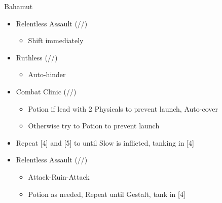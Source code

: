 \documentclass{report}
\begin{document}
\renewcommand{\first}{[1] Relentless Assault (\com/\rav/\rav)}
\renewcommand{\fifth}{[5] Ruthless (\sab/\com/\rav)
\renewcommand{\fourth}{[4] Combat Clinic (\sen/\med/\med)}}
\begin{battle}{Bahamut}
\begin{itemize}
    \item \first
    \begin{itemize}
        \item Shift immediately
    \end{itemize}
    \item \fifth
    \begin{itemize}
        \item Auto-hinder
    \end{itemize}
    \item \fourth
    \begin{itemize}
        \item Potion if lead with 2 Physicals to prevent launch, Auto-cover
        \item Otherwise try to Potion to prevent launch
    \end{itemize}
    \item Repeat [4] and [5] to until Slow is inflicted, tanking in [4]
    \item \first
    \begin{itemize}
        \item Attack-Ruin-Attack
        \item Potion as needed, Repeat until Gestalt, tank in [4]
    \end{itemize}
\end{itemize}
\end{battle}
\chapter{}
\end{document}

